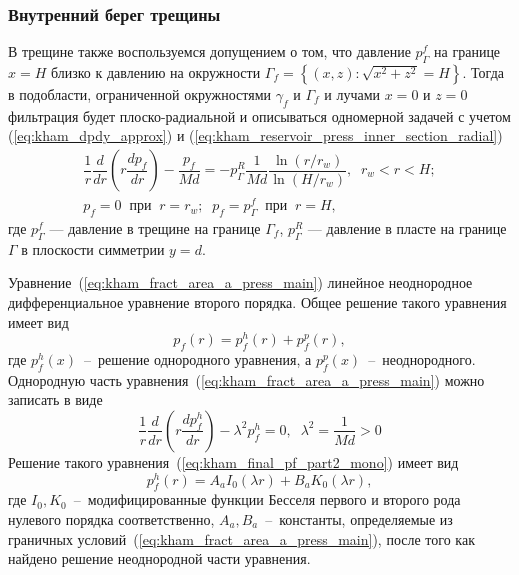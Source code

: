 \documentclass{article}
\newcommand{\mysub}[1]{%
  \par\vspace{0.5em}\noindent{\normalsize\underline{#1}}\par\vspace{0.5em}%
}
\begin{document}
\subsubsection{Внутренний берег трещины}

\mysub{Подобласть (а) $r_w \leq x < H$}
В трещине также воспользуемся допущением о том, что давление $p^f_{\Gamma}$ на границе $x=H$ близко к давлению на окружности $\Gamma_f=\left\{\left(x,z\right): \sqrt{x^2 + z^2} = H \right\}$. Тогда в подобласти, ограниченной окружностями $\gamma_f$ и $\Gamma_f$ и лучами $x=0$ и $z=0$ фильтрация будет плоско-радиальной и описываться одномерной задачей с учетом (\ref{eq:kham_dpdy_approx}) и (\ref{eq:kham_reservoir_press_inner_section_radial})
\begin{equation}
\displaystyle
\begin{gathered}
\dfrac{1}{r}\dfrac{d}{dr}\left(r\dfrac{d p_f}{dr}\right) - \dfrac{p_f}{Md} = - p^R_{\Gamma}\dfrac{1}{Md} \dfrac{\ln{\left(r/r_w\right)}}{\ln{\left(H/r_w\right)}}, \;\; r_w < r < H;    \\[8pt]
p_f = 0 \;\; \text{при} \;\; r = r_w; \;\; p_f = p^f_{\Gamma} \;\; \text{при} \;\; r = H,
\end{gathered}
\label{eq:kham_fract_area_a_press_main}
\end{equation}
где $p^f_{\Gamma}$ — давление в трещине на границе $\Gamma_f$, $p^R_{\Gamma}$ — давление в пласте на границе $\Gamma$ в плоскости симметрии $y=d$.

Уравнение~(\ref{eq:kham_fract_area_a_press_main}) линейное неоднородное дифференциальное уравнение второго порядка.
Общее решение такого уравнения имеет вид
\begin{equation}
\displaystyle
p_f(r) = p_f^h\left(r\right) + p_f^p\left(r\right),
\label{eq:kham_kham_final_pf_ode_solution_view}
\end{equation}
где $p_f^h\left(x\right)$~--~решение однородного уравнения, а $p_f^p\left(x\right)$~--~неоднородного.
Однородную часть уравнения~(\ref{eq:kham_fract_area_a_press_main}) можно записать в виде
\begin{equation}
\displaystyle
\dfrac{1}{r}\dfrac{d}{dr}\left(r\dfrac{d p_f^h}{dr}\right) - \lambda^2 p_f^h = 0,  \;\; \lambda^2 = \dfrac{1}{Md} > 0
\label{eq:kham_final_pf_part2_mono}
\end{equation}
Решение такого уравнения~(\ref{eq:kham_final_pf_part2_mono}) имеет вид
\begin{equation}
\displaystyle
p_f^h\left(r\right) = A_a I_0\left(\lambda r\right) + B_a K_0\left(\lambda r\right),
\label{eq:kham_fa2_press_uniform_solution_main}
\end{equation}
где $I_0, K_0$~--~модифицированные функции Бесселя первого и второго рода нулевого порядка соответственно,
$A_a,B_a$~--~константы, определяемые из граничных условий~(\ref{eq:kham_fract_area_a_press_main}), после того как найдено решение неоднородной части уравнения.
\end{document}

